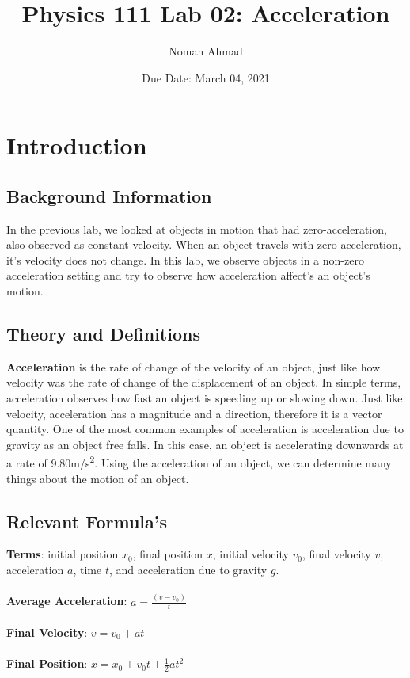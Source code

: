 \documentclass{article}
\title{Physics 111 Lab 02: Acceleration}
\author{Noman Ahmad }
\date{Due Date: March 04, 2021}
\begin{document}
\maketitle

\section{Introduction}
\subsection{Background Information} 
In the previous lab, we looked at objects in motion that had zero-acceleration, also observed as constant velocity. When an object travels with zero-acceleration, it's velocity does not change. In this lab, we observe objects in a non-zero acceleration setting and try to observe how acceleration affect's an object's motion. 
\subsection{Theory and Definitions}
\textbf{Acceleration} is the rate of change of the velocity of an object, just like how velocity was the rate of change of the displacement of an object. In simple terms, acceleration observes how fast an object is speeding up or slowing down. Just like velocity, acceleration has a magnitude and a direction, therefore it is a vector quantity. One of the most common examples of acceleration is acceleration due to gravity as an object free falls. In this case, an object is accelerating downwards at a rate of 9.80\si[per-mode=symbol]{\meter\per\second\squared}. Using the acceleration of an object, we can determine many things about the motion of an object. 
\subsection{Relevant Formula's} 
\textbf{Terms}: initial position \(x_0\), final position \(x\), initial velocity \(v_0\), final velocity \(v\), acceleration \(a\), time \(t\), and acceleration due to gravity \(g\). \\ \\ 
\textbf{Average Acceleration}: \(a=\frac{(v-v_0)}{t}\) \\ \\
\textbf{Final Velocity}: \(v = v_0 + at\) \\ \\ 
\textbf{Final Position}: \(x = x_0 + v_0t + \frac{1}{2}at^2\)
\end{document}
